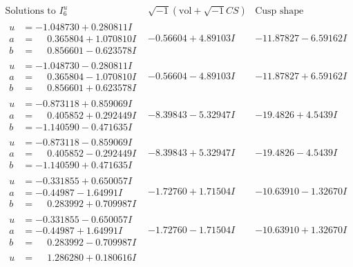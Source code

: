 \documentclass[1p]{elsarticle_modified}
\theoremstyle{definition}
\newcommand{\I}{\sqrt{-1}}
\begin{document}
$$\begin{array}{c|c|c}  
\text{Solutions to }I^u_{6}& \I (\text{vol} + \sqrt{-1}CS) & \text{Cusp shape}\\
 \hline 
\begin{aligned}
u &= -1.048730 + 0.280811 I \\
a &= \phantom{-}0.365804 + 1.070810 I \\
b &= \phantom{-}0.856601 - 0.623578 I\end{aligned}
 & -0.56604 + 4.89103 I & -11.87827 - 6.59162 I \\ \hline\begin{aligned}
u &= -1.048730 - 0.280811 I \\
a &= \phantom{-}0.365804 - 1.070810 I \\
b &= \phantom{-}0.856601 + 0.623578 I\end{aligned}
 & -0.56604 - 4.89103 I & -11.87827 + 6.59162 I \\ \hline\begin{aligned}
u &= -0.873118 + 0.859069 I \\
a &= \phantom{-}0.405852 + 0.292449 I \\
b &= -1.140590 - 0.471635 I\end{aligned}
 & -8.39843 - 5.32947 I & -19.4826 + 4.5439 I \\ \hline\begin{aligned}
u &= -0.873118 - 0.859069 I \\
a &= \phantom{-}0.405852 - 0.292449 I \\
b &= -1.140590 + 0.471635 I\end{aligned}
 & -8.39843 + 5.32947 I & -19.4826 - 4.5439 I \\ \hline\begin{aligned}
u &= -0.331855 + 0.650057 I \\
a &= -0.44987 - 1.64991 I \\
b &= \phantom{-}0.283992 + 0.709987 I\end{aligned}
 & -1.72760 + 1.71504 I & -10.63910 - 1.32670 I \\ \hline\begin{aligned}
u &= -0.331855 - 0.650057 I \\
a &= -0.44987 + 1.64991 I \\
b &= \phantom{-}0.283992 - 0.709987 I\end{aligned}
 & -1.72760 - 1.71504 I & -10.63910 + 1.32670 I \\ \hline\begin{aligned}
u &= \phantom{-}1.286280 + 0.180616 I \\

\end{aligned}
\end{array}$$
\end{document}
